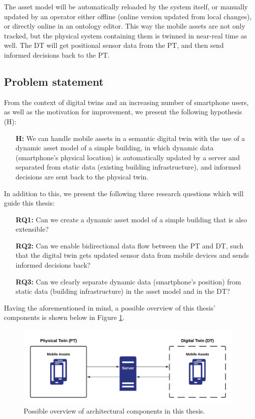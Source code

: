 \documentclass{article}
\begin{document}
The asset model will be automatically reloaded by the system itself, or manually updated by an operator either offline (online version updated from local changes), or directly online in an ontology editor. This way the mobile assets are not only tracked, but the physical system containing them is twinned in near-real time as well. The DT will get positional sensor data from the PT, and then send informed decisions back to the PT.

\subsection{Problem statement}
From the context of digital twins and an increasing number of smartphone users, as well as the motivation for improvement, we present the following hypothesis (H):

\begin{itemize}
    \item[\textbf{H:}] We can handle mobile assets in a semantic digital twin with the use of a dynamic asset model of a simple building, in which dynamic data (smartphone's physical location) is automatically updated by a server and separated from static data (existing building infrastructure), and informed decisions are sent back to the physical twin.
\end{itemize}


In addition to this, we present the following three research questions which will guide this thesis:
\begin{itemize}
    \item[\textbf{RQ1:}]
    Can we create a dynamic asset model of a simple building that is also extensible?
    \item [\textbf{RQ2:}] 
    Can we enable bidirectional data flow between the PT and DT, such that the digital twin gets updated sensor data from mobile devices and sends informed decisions back?
    \item [\textbf{RQ3:}]
    Can we clearly separate dynamic data (smartphone's position) from static data (building infrastructure) in the asset model and in the DT?
\end{itemize}

Having the aforementioned in mind, a possible overview of this thesis' components is shown below in Figure \ref{fig:initial_components}.

\begin{figure}[H]
    \centering
    \includegraphics[scale=0.14]{graphics/initial_thesis_overview.png}
    \caption{Possible overview of architectural components in this thesis.}
    \label{fig:initial_components}
\end{figure}
\end{document}
